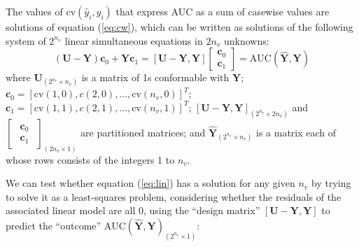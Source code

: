 \documentclass[
]{jss}
\begin{document}
The values of \(\mathrm{cv}(\widehat{y}_i, y_i)\) that express AUC as a
sum of casewise values are solutions of equation (\ref{eq:cw}), which
can be written as solutions of the following system of \(2^{n_v}\)
linear simultaneous equations in \(2n_v\) unknowns: \begin{equation}
\label{eq:lin}
\tag{2}
(\mathbf{U} -\mathbf{Y}) \mathbf{c}_0 + \mathbf{Y} \mathbf{c}_1
=
[\mathbf{U} -\mathbf{Y}, \mathbf{Y}]
\begin{bmatrix}
\mathbf{c}_0 \\ \mathbf{c}_1
\end{bmatrix}
= \mathrm{AUC}(\mathbf{\widehat{Y}},\mathbf{Y})
\end{equation} where \(\mathbf{U}_{(2^{n_v} \times n_v)}\) is a matrix
of 1s conformable with \(\mathbf{Y}\);
\(\mathbf{c}_0 = [\mathrm{cv}(1,0), c(2,0), ..., \mathrm{cv}(n_v,0)]^T\);
\(\mathbf{c}_1 = [\mathrm{cv}(1,1), c(2,1), ..., \mathrm{cv}(n_v,1)]^T\);
\([\mathbf{U} -\mathbf{Y}, \mathbf{Y}]_{(2^{n_v} \times 2n_v)}\) and
\(\begin{bmatrix}\begin{aligned} \mathbf{c}_0 \\ \mathbf{c}_1 \end{aligned} \end{bmatrix}_{(2n_v \times 1)}\)
are partitioned matrices; and
\(\mathbf{\widehat{Y}}_{(2^{n_v} \times n_v)}\) is a matrix each of
whose rows consists of the integers 1 to \(n_v\).

We can test whether equation (\ref{eq:lin}) has a solution for any given
\(n_v\) by trying to solve it as a least-squares problem, considering
whether the residuals of the associated linear model are all 0, using
the ``design matrix'' \([\mathbf{U} -\mathbf{Y}, \mathbf{Y}]\) to
predict the ``outcome''
\(\mathrm{AUC}(\mathbf{\widehat{Y}},\mathbf{Y})_{(2^{n_v} \times 1)}\):

\begin{CodeChunk}
\end{CodeChunk}
\end{document}
